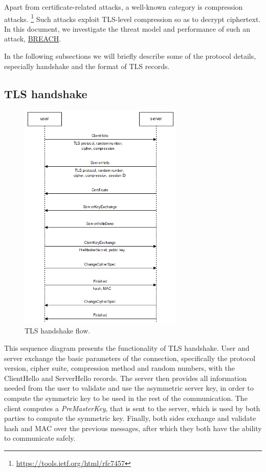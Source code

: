 Apart from certificate-related attacks, a well-known category is compression attacks. \footnote{\url{https://tools.ietf.org/html/rfc7457}} Such attacks exploit TLS-level compression so as to decrypt ciphertext. In this document, we investigate the threat model and performance of such an attack, \href{http://breachattack.com}{BREACH}.

In the following subsections we will briefly describe some of the protocol details, especially handshake and the format of TLS records.

\subsection{TLS handshake}

\begin{figure}[H] \caption{TLS handshake flow.} \centering \includegraphics[width=0.7\textwidth]{diagrams/tls_handshake.png}\end{figure}

This sequence diagram presents the functionality of TLS handshake. User and server exchange the basic parameters of the connection, specifically the protocol version, cipher suite, compression method and random numbers, with the ClientHello and ServerHello records. The server then provides all information needed from the user to validate and use the asymmetric server key, in order to compute the symmetric key to be used in the rest of the communication. The client computes a \textit{PreMasterKey}, that is sent to the server, which is used by both parties to compute the symmetric key. Finally, both sides exchange and validate hash and MAC over the previous messages, after which they both have the ability to communicate safely.

